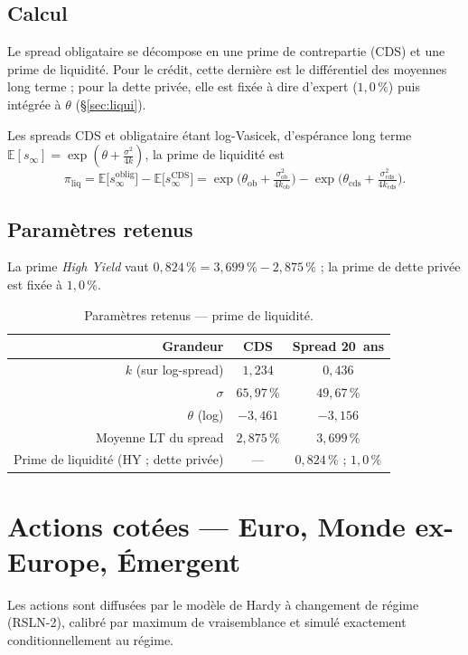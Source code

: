 \documentclass[11pt,a4paper]{article}
\newcommand{\tablehead}[1]{{\sffamily\bfseries\color{nxnavy}#1}}
\begin{document}
\subsection{Calcul}
Le spread obligataire se décompose en une prime de contrepartie (CDS) et une prime de liquidité. Pour le crédit, cette dernière est le différentiel des moyennes long terme ; pour la dette privée, elle est fixée à dire d'expert ($1{,}0\,\%$) puis intégrée à $\theta$ (\S\ref{sec:liqui}).
\begin{definitionbox}
Les spreads CDS et obligataire étant log-Vasicek, d'espérance long terme $\mathbb E[s_\infty]=\exp(\theta+\tfrac{\sigma^2}{4k})$, la prime de liquidité est
\[
\pi_{\mathrm{liq}}=\mathbb E\big[s^{\mathrm{oblig}}_\infty\big]-\mathbb E\big[s^{\mathrm{CDS}}_\infty\big]
=\exp\!\Big(\theta_{\mathrm{ob}}+\tfrac{\sigma_{\mathrm{ob}}^2}{4k_{\mathrm{ob}}}\Big)-\exp\!\Big(\theta_{\mathrm{cds}}+\tfrac{\sigma_{\mathrm{cds}}^2}{4k_{\mathrm{cds}}}\Big).
\]
\end{definitionbox}

\subsection{Paramètres retenus}
La prime \emph{High Yield} vaut $0{,}824\,\%=3{,}699\,\%-2{,}875\,\%$ ; la prime de dette privée est fixée à $1{,}0\,\%$.
\begin{table}[H]
\centering\small
\renewcommand{\arraystretch}{1.4}\setlength{\tabcolsep}{6pt}
\begin{tabularx}{\linewidth}{R c c}
\toprule
\tablehead{Grandeur} & \tablehead{CDS} & \tablehead{Spread 20~ans} \\
\midrule
{} $k$ (sur log-spread) & $1{,}234$ & $0{,}436$ \\
$\sigma$ & $65{,}97\,\%$ & $49{,}67\,\%$ \\
 $\theta$ (log) & $-3{,}461$ & $-3{,}156$ \\
Moyenne LT du spread & $2{,}875\,\%$ & $3{,}699\,\%$ \\
 Prime de liquidité (HY ; dette privée) & --- & $0{,}824\,\%$ ; $1{,}0\,\%$ \\
\bottomrule
\end{tabularx}
\caption{Paramètres retenus --- prime de liquidité.}
\end{table}

\clearpage
\section{Actions cotées --- Euro, Monde ex-Europe, Émergent}
Les actions sont diffusées par le modèle de Hardy à changement de régime (RSLN-2), calibré par maximum de vraisemblance et simulé exactement conditionnellement au régime.
\end{document}
